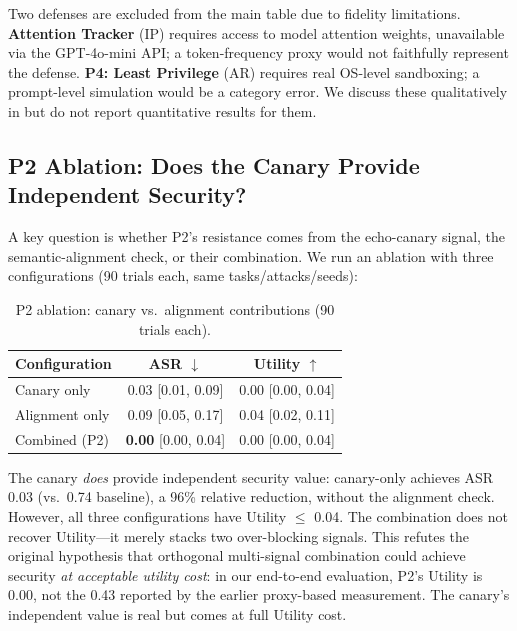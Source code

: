 Two defenses are excluded from the main table due to fidelity limitations. \textbf{Attention Tracker} (IP) requires access to model attention weights, unavailable via the GPT-4o-mini API; a token-frequency proxy would not faithfully represent the defense. \textbf{P4: Least Privilege} (AR) requires real OS-level sandboxing; a prompt-level simulation would be a category error. We discuss these qualitatively in  but do not report quantitative results for them.

\subsection{P2 Ablation: Does the Canary Provide Independent Security?}
\label{sec:p2_ablation}

A key question is whether P2's resistance comes from the echo-canary signal, the semantic-alignment check, or their combination. We run an ablation with three configurations (90 trials each, same tasks/attacks/seeds):

\begin{table}[t]
\centering
\small
\caption{P2 ablation: canary vs.\ alignment contributions (90 trials each).}
\label{tab:p2_ablation}
\begin{tabular}{lcc}
\toprule
Configuration & ASR $\downarrow$ & Utility $\uparrow$ \\
\midrule
Canary only & 0.03 [0.01, 0.09] & 0.00 [0.00, 0.04] \\
Alignment only & 0.09 [0.05, 0.17] & 0.04 [0.02, 0.11] \\
Combined (P2) & \textbf{0.00} [0.00, 0.04] & 0.00 [0.00, 0.04] \\
\bottomrule
\end{tabular}
\end{table}

The canary \emph{does} provide independent security value: canary-only achieves ASR 0.03 (vs.\ 0.74 baseline), a 96\% relative reduction, without the alignment check. However, all three configurations have Utility $\leq$ 0.04. The combination does not recover Utility---it merely stacks two over-blocking signals. This refutes the original hypothesis that orthogonal multi-signal combination could achieve security \emph{at acceptable utility cost}: in our end-to-end evaluation, P2's Utility is 0.00, not the 0.43 reported by the earlier proxy-based measurement. The canary's independent value is real but comes at full Utility cost.
